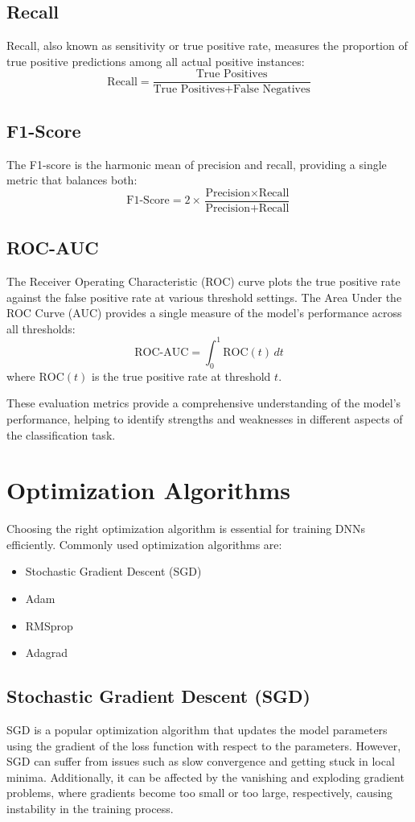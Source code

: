 \documentclass[12pt]{article}
\begin{document}
\subsection{Recall}
Recall, also known as sensitivity or true positive rate, measures the proportion of true positive predictions among all actual positive instances:
\[
\text{Recall} = \frac{\text{True Positives}}{\text{True Positives} + \text{False Negatives}}
\]

\subsection{F1-Score}
The F1-score is the harmonic mean of precision and recall, providing a single metric that balances both:
\[
\text{F1-Score} = 2 \times \frac{\text{Precision} \times \text{Recall}}{\text{Precision} + \text{Recall}}
\]

\subsection{ROC-AUC}
The Receiver Operating Characteristic (ROC) curve plots the true positive rate against the false positive rate at various threshold settings. The Area Under the ROC Curve (AUC) provides a single measure of the model's performance across all thresholds:
\[
\text{ROC-AUC} = \int_{0}^{1} \text{ROC}(t) \, dt
\]
where \( \text{ROC}(t) \) is the true positive rate at threshold \( t \).

These evaluation metrics provide a comprehensive understanding of the model's performance, helping to identify strengths and weaknesses in different aspects of the classification task.

\section{Optimization Algorithms}
Choosing the right optimization algorithm is essential for training DNNs efficiently. Commonly used optimization algorithms are:
\begin{itemize}
    \item Stochastic Gradient Descent (SGD)
    \item Adam
    \item RMSprop
    \item Adagrad
\end{itemize}

\subsection{Stochastic Gradient Descent (SGD)}
SGD is a popular optimization algorithm that updates the model parameters using the gradient of the loss function with respect to the parameters. However, SGD can suffer from issues such as slow convergence and getting stuck in local minima. Additionally, it can be affected by the vanishing and exploding gradient problems, where gradients become too small or too large, respectively, causing instability in the training process.
\end{document}
